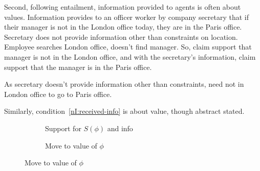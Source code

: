 \begin{note}[\RBV{}]
  Second, following entailment, information provided to agents is often about values.
  Information provides to an officer worker by company secretary that if their manager is not in the London office today, they are in the Paris office.
  Secretary does not provide information other than constraints on location.
  Employee searches London office, doesn't find manager.
  So, claim support that manager is not in the London office, and with the secretary's information, claim support that the manager is in the Paris office.

  As secretary doesn't provide information other than constraints, need not in London office to go to Paris office.

  Similarly, condition~\ref{nI:received-info} is about value, though abstract stated.

  \begin{figure}[H]
    \begin{subfigure}{.45\textwidth}
      \centering
      \caption{Support for \(S(\phi)\) and info}
    \end{subfigure}
    \hfill
    \begin{subfigure}{.45\textwidth}
      \centering
      \caption{Move to value of \(\phi\)}
    \end{subfigure}


\end{figure}
\end{note}
